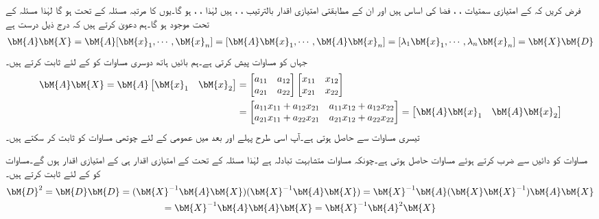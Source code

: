
فرض کریں کہ  کے امتیازی سمتیات ،  ، فضا  کی اساس ہیں اور ان کے مطابقتی امتیازی اقدار بالترتیب ، ، ہیں لہٰذا ، ، ہو گا۔یوں  کا مرتبہ مسئلہ  کے تحت  ہو گا لہٰذا مسئلہ  کے تحت   موجود ہو گا۔ہم دعویٰ کرتے ہیں کہ درج ذیل درست ہے
\begin{align}\label{مساوات_امتیازی_وتری_حصول_پ}
\bM{A}\bM{X}=\bM{A}[\bM{x}_1,\cdots,\bM{x}_n]=[\bM{A}\bM{x}_1,\cdots,\bM{A}\bM{x}_n]=[\lambda_1\bM{x}_1,\cdots,\lambda_n\bM{x}_n]=\bM{X}\bM{D}
\end{align}
جہاں  کو مساوات  پیش کرتی ہے۔ہم بائیں ہاتھ دوسری مساوات کو  کے لئے ثابت کرتے ہیں۔
\begin{align*}
\bM{A}\bM{X}=\bM{A}\begin{bmatrix}\bM{x}_1\quad \bM{x}_2\end{bmatrix}&=\begin{bmatrix}a_{11}\quad a_{12}\\a_{21}\quad a_{22}  \end{bmatrix}\begin{bmatrix}x_{11}\quad x_{12}\\x_{21}\quad x_{22}  \end{bmatrix}\\
&=\begin{bmatrix} a_{11}x_{11}+a_{12}x_{21}\quad a_{11}x_{12}+a_{12}x_{22} \\ a_{21}x_{11}+a_{22}x_{21}\quad a_{21}x_{12}+a_{22}x_{22}\end{bmatrix}=\begin{bmatrix} \bM{A}\bM{x}_1\quad \bM{A}\bM{x}_2 \end{bmatrix}
\end{align*}
تیسری مساوات  سے حاصل ہوتی ہے۔آپ اسی طرح پہلے  اور بعد میں عمومی  کے لئے چوتھی مساوات کو ثابت کر سکتے ہیں۔

مساوات  کو دائیں  سے ضرب کرتے ہوئے مساوات  حاصل ہوتی ہے۔چونکہ مساوات  متشابہت تبادلہ ہے  لہٰذا مسئلہ  کے تحت  کے امتیازی اقدار ہی  کے امتیازی اقدار  ہوں گے۔مساوات  کو  کے لئے ثابت کرتے ہیں۔
\begin{multline*}
\bM{D}^2=\bM{D}\bM{D}=(\bM{X}^{-1}\bM{A}\bM{X})(\bM{X}^{-1}\bM{A}\bM{X})=\bM{X}^{-1}\bM{A}(\bM{X}\bM{X}^{-1})\bM{A}\bM{X}\\
=\bM{X}^{-1}\bM{A}\bM{A}\bM{X}=\bM{X}^{-1}\bM{A}^2\bM{X}
\end{multline*}

